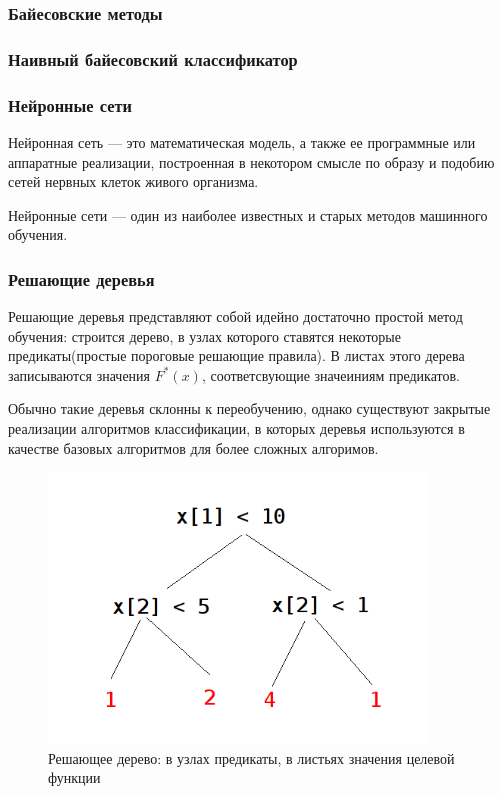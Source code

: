 \subsubsection{Байесовские методы}
\subsubsection{Наивный байесовский классификатор}
\subsubsection{Нейронные сети}
Нейронная сеть — это математическая модель, а также ее программные или аппаратные реализации, построенная в некотором смысле по образу и подобию сетей нервных клеток живого организма.

Нейронные сети — один из наиболее известных и старых методов машинного обучения.

\subsubsection{Решающие деревья}
Решающие деревья представляют собой идейно достаточно простой метод обучения: строится дерево, в узлах которого ставятся некоторые предикаты(простые пороговые решающие правила). В листах этого дерева записываются значения $F^*(x)$, соответсвующие значеиниям предикатов.

Обычно такие деревья склонны к переобучению, однако существуют закрытые реализации алгоритмов классификации, в которых деревья используются в качестве базовых алгоритмов для более сложных алгоримов.
\begin{figure}[h]
\begin{center}
\includegraphics[width=10cm]{img/d_tree}
\end{center}
\caption{Решающее дерево: в узлах предикаты, в листьях значения целевой функции}
\label{d_tree}
\end{figure}

